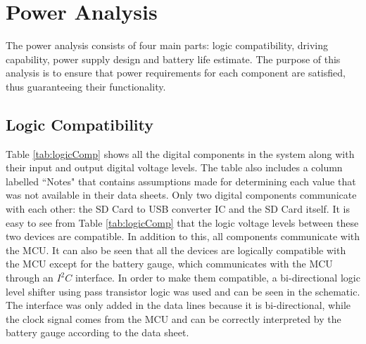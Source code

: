 \section{Power Analysis}
The power analysis consists of four main parts: logic compatibility, driving capability, power supply design and battery life estimate. The purpose of this analysis is to ensure that power requirements for each component are satisfied, thus guaranteeing their functionality.

\subsection{Logic Compatibility}

Table \ref{tab:logicComp} shows all the digital components in the system along with their input and output digital voltage levels.  The table also includes a column labelled ``Notes" that contains assumptions made for determining each value that was not available in their data sheets.  Only two digital components communicate with each other: the SD Card to USB converter IC and the SD Card itself.  It is easy to see from Table \ref{tab:logicComp} that the logic voltage levels between these two devices are compatible.  In addition to this, all components communicate with the MCU.  It can also be seen that all the devices are logically compatible with the MCU except for the battery gauge, which communicates with the MCU through an $I^2C$ interface.  In order to make them compatible, a bi-directional logic level shifter using pass transistor logic was used and can be seen in the schematic.  The interface was only added in the data lines because it is bi-directional, while the clock signal comes from the MCU and can be correctly interpreted by the battery gauge according to the data sheet.


